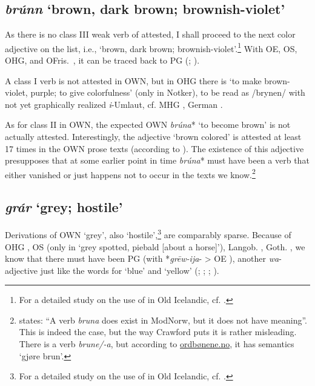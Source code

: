 \documentclass[output=paper,colorlinks,citecolor=brown]{langscibook}
\begin{document}
\subsection{\textit{brúnn} ‘brown, dark brown; brownish-violet’}
\label{sec:OWNbrown}

As there is no class III weak verb of  attested, I shall proceed to the next color adjective on the list, i.e.,  ‘brown, dark brown; brownish-violet’.\footnote{For a detailed study on the use of  in Old Icelandic, cf. \citet{Wolf2017}.} With OE, OS, OHG, and OFris.\ , it can be traced back to PG  (; ).   

A class I verb is not attested in OWN, but in OHG there is  ‘to make brown-violet, purple; to give colorfulness’ (only in Notker), to be read as /brynen/ with not yet graphically realized \textit{i}-Umlaut, cf. MHG , German . 

As for class II in OWN, the expected OWN \textit{brúna}* ‘to become brown’ is not actually attested. Interestingly, the adjective  ‘brown colored’ is attested at least 17 times in the OWN prose texts (according to ). The existence of this adjective presupposes that at some earlier point in time \textit{brúna}* must have been a verb that either vanished or just happens not to occur in the texts we know.\footnote{\citet[132, Fn. 30]{Crawford2014} states: “A verb \textit{bruna}  does exist in ModNorw, but it does not have  meaning”. This is indeed the case, but the way Crawford puts it is rather misleading. There is a verb \textit{brune/-a}, but according to \href{ordbønene.no}{ordbønene.no}, it has  semantics ‘gjøre brun’.}

\subsection{\textit{grár} ‘grey; hostile’}
\label{sec:OWNgrey}

Derivations of OWN  ‘grey’, also ‘hostile’,\footnote{For a detailed study on the use of  in Old Icelandic, cf. \citet{Wolf2009}.} are comparably sparse. Because of OHG , OS  (only in  ‘grey spotted, piebald [about a horse]’), Langob. , Goth. , we know that there must have been PG  (with *\textit{grēw-ija}- > OE ), another \textit{wa}-adjective just like the words for ‘blue’ and ‘yellow’ (; ; \citealt[265--266]{Luhr2000}; ).
\end{document}

